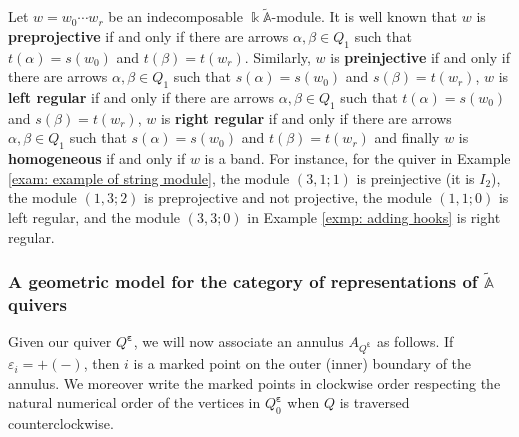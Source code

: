 \documentclass[12pt]{amsart}
\theoremstyle{plain}
\theoremstyle{definition}
\theoremstyle{remark}
\begin{document}
Let $w = w_0\cdots w_r$ be an indecomposable $\Bbbk \mathbb{\tilde{A}}$-module. It is well known that $w$ is \textbf{preprojective} if and only if there are arrows $\alpha,\beta\in Q_1$ such that $t(\alpha) = s(w_0)$ and $t(\beta) = t(w_r)$. Similarly, $w$ is \textbf{preinjective} if and only if there are arrows $\alpha,\beta\in Q_1$ such that $s(\alpha) = s(w_0)$ and $s(\beta) = t(w_r)$, $w$ is \textbf{left regular} if and only if there are arrows $\alpha,\beta\in Q_1$ such that $t(\alpha) = s(w_0)$ and $s(\beta) = t(w_r)$, $w$ is \textbf{right regular} if and only if there are arrows $\alpha,\beta\in Q_1$ such that $s(\alpha) = s(w_0)$ and $t(\beta) = t(w_r)$ and finally $w$ is \textbf{homogeneous} if and only if $w$ is a band. {\color{black} For instance, for the quiver in Example \ref{exam: example of string module}, the module $(3,1;1)$ is preinjective (it is $I_2$), the module $(1,3;2)$ is preprojective and not projective, the module $(1,1;0)$ is left regular, and the module $(3,3;0)$ in Example \ref{exmp: adding hooks} is right regular.}

\subsubsection{A geometric model for the category of representations of $\tilde{\mathbb{A}}$ quivers}

Given our quiver $Q^{\bm{\varepsilon}}$, we will now associate an annulus $A_{Q^{\bm{\varepsilon}}}$ as follows. If $\varepsilon_i = +(-)$, then $i$ is a marked point on the outer (inner) boundary of the annulus. We moreover write the marked points in clockwise order respecting the natural numerical order of the vertices in $Q^{\bm{\varepsilon}}_0$ {when $Q$ is traversed counterclockwise.}  
\end{document}
